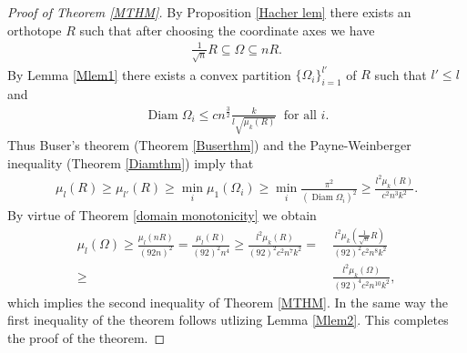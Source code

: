 \documentclass[12pt]{amsart}
\theoremstyle{plain}
\theoremstyle{remark}
\newcommand{\diam}{\operatorname{Diam}}
\begin{document}
\begin{proof}[Proof of Theorem \ref{MTHM}]By Proposition \ref{Hacher lem} there exists an orthotope $R$ such that after choosing the coordinate axes we have
\begin{align*}
    \frac{1}{\sqrt{n}}R\subseteq \Omega \subseteq n R.
\end{align*}
By Lemma \ref{Mlem1} there exists a convex partition $\{\Omega_i\}_{i=1}^{l'}$ of $R$ such that $l'\leq l$ and 
\begin{align*}
    \diam \Omega_i \leq cn^{\frac{3}{2}}\frac{k}{l\sqrt{\mu_k(R)}}\ \text{ for all }i.
\end{align*}
Thus Buser's theorem (Theorem \ref{Buserthm}) and the Payne-Weinberger inequality (Theorem \ref{Diamthm}) imply that
\begin{align*}
    \mu_l(R)\geq \mu_{l'}(R)\geq \min_i \mu_1(\Omega_i)\geq \min_i \frac{\pi^2}{(\diam \Omega_i)^2} \geq  \frac{l^2\mu_k(R)}{c^2n^3k^2}.
\end{align*}By virtue of Theorem \ref{domain monotonicity} we obtain
\begin{align*}
    \mu_l(\Omega)\geq \frac{\mu_l(nR)}{(92 n)^{2}}=\frac{\mu_l(R)}{(92)^{2}n^{4}}\geq \frac{l^2\mu_k(R)}{(92)^2c^2n^7k^2}= \ &\frac{l^2\mu_k(\frac{1}{\sqrt{n}}R)}{(92)^2c^2n^8k^2}\\ \geq \ &\frac{l^2\mu_k(\Omega)}{(92)^4c^2n^{10}k^2},
\end{align*}which implies the second inequality of Theorem \ref{MTHM}. In the same way the first inequality of the theorem follows utlizing Lemma \ref{Mlem2}. This completes the proof of the theorem.  


\end{proof}
\end{document}
